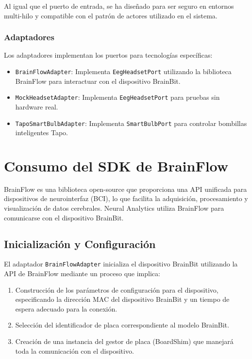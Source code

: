 Al igual que el puerto de entrada, se ha diseñado para ser seguro en entornos multi-hilo y compatible con el patrón de actores utilizado en el sistema.

\subsubsection{Adaptadores}

Los adaptadores implementan los puertos para tecnologías específicas:

\begin{itemize}
    \item \texttt{BrainFlowAdapter}: Implementa \texttt{EegHeadsetPort} utilizando la biblioteca BrainFlow para interactuar con el dispositivo BrainBit.
    \item \texttt{MockHeadsetAdapter}: Implementa \texttt{EegHeadsetPort} para pruebas sin hardware real.
    \item \texttt{TapoSmartBulbAdapter}: Implementa \texttt{SmartBulbPort} para controlar bombillas inteligentes Tapo.
\end{itemize}

\section{Consumo del SDK de BrainFlow}

BrainFlow es una biblioteca open-source que proporciona una API unificada para dispositivos de neurointerfaz (BCI), lo que facilita la adquisición, procesamiento y visualización de datos cerebrales. Neural Analytics utiliza BrainFlow para comunicarse con el dispositivo BrainBit.

\subsection{Inicialización y Configuración}

El adaptador \texttt{BrainFlowAdapter} inicializa el dispositivo BrainBit utilizando la API de BrainFlow mediante un proceso que implica:

\begin{enumerate}
    \item Construcción de los parámetros de configuración para el dispositivo, especificando la dirección MAC del dispositivo BrainBit y un tiempo de espera adecuado para la conexión.
    \item Selección del identificador de placa correspondiente al modelo BrainBit.
    \item Creación de una instancia del gestor de placa (BoardShim) que manejará toda la comunicación con el dispositivo.
\end{enumerate}

